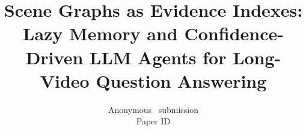 \documentclass[10pt,twocolumn,letterpaper]{article}
\title{Scene Graphs as Evidence Indexes: Lazy Memory and Confidence-Driven
       LLM Agents for Long-Video Question Answering}
\author{Anonymous \confName~submission\\
Paper ID \paperID
}
\begin{document}
\maketitle

\begin{abstract}
\end{abstract}


% 

% 

{
    \small
    
}

% 
\end{document}
